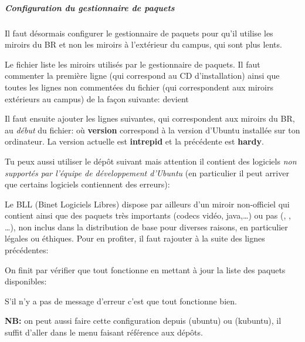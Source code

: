  \subparagraph{Configuration du gestionnaire de paquets} \label{ubuntu_mirror} Il faut désormais configurer le gestionnaire de paquets pour
qu'il utilise les miroirs du BR et non les miroirs à l'extérieur du
campus, qui sont plus lents.

Le fichier  liste les miroirs utilisés par le gestionnaire de paquets. Il faut commenter la première ligne (qui
correspond au CD d'installation) ainsi que toutes les lignes non commentées du fichier (qui correspondent aux miroirs extérieurs au campus) de la
façon suivante:
devient

Il faut ensuite ajouter les lignes suivantes, qui correspondent aux miroirs du BR, au \emph{début} du fichier:
où \textbf{version} correspond à la version d'Ubuntu installée sur ton ordinateur. La version actuelle est \textbf{intrepid} et la précédente est \textbf{hardy}.

Tu peux aussi utiliser le dépôt suivant mais attention il contient des logiciels \emph{non supportés par l'équipe de développement d'Ubuntu} (en particulier il peut arriver que certains logiciels contiennent des erreurs):

Le BLL (Binet Logiciels Libres) dispose par ailleurs d'un miroir non-officiel qui contient  ainsi que des paquets très importants (codecs
vidéo, java,\dots) ou pas (, , \dots), non inclus dans la distribution de base pour diverses raisons, en particulier légales ou
éthiques. Pour en profiter, il faut rajouter à la suite des lignes précédentes:


On finit par vérifier que tout fonctionne en mettant à jour la liste
des paquets disponibles:

S'il n'y a pas de message d'erreur c'est que tout fonctionne bien.

\textbf{NB:} on peut aussi faire cette configuration depuis  (ubuntu) ou  (kubuntu), il suffit d'aller dans le menu faisant référence aux dépôts.
